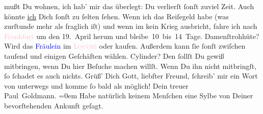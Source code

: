                mußt Du wohnen, ich hab’ mir das überlegt: Du verlierſt ſonſt zuviel Zeit. Auch
               könnte \uline{ich} Dich ſonſt zu ſelten ſehen.\pend
           \pstart
           {\pb}Wenn ich das Reiſegeld habe (was zurſtunde mehr als
               fraglich iſt) und wenn im \label{K_L02807-23v}\label{K_L02807-23h} kein Krieg ausbricht, fahre ich nach \textcolor{pink}{Frankfurt}{}\ledrightnote{\textcolor{pink}{Frankfurt am Main}} um den 19. April herum und
               bleibe 10 bis 14 Tage.\pend
           \pstart
           Damenſtrohhüte? Wird  das \textcolor{blue}{Fräulein}{} im \textcolor{pink}{\textsc{Louvre}}{}\ledrightnote{\textcolor{pink}{Louvre}} oder \label{K_L02807-45v}\label{K_L02807-45h} kaufen.  Außerdem kann ſie ſonſt zwiſchen
               tauſend und einigen Geſchäften wählen.\pend
           \pstart
           Cylinder? Den ſollſt Du gewiß mitbringen,
                wenn Du hier Beſuche machen willſt. Wenn {\pb}Du ihn nicht mitbringſt, ſo ſchadet es auch nichts.\pend
           \pstart
           Grüß’ Dich Gott, liebſter Freund, ſchreib’ mir ein Wort \strikeout{\textcolor{gray}{×}} von unterwegs und komme ſo bald als möglich!\pend
           \pstart
           Dein treuer {\\[\baselineskip]}\spacefill\mbox{Paul Goldmann.}\pend
           \leftskip=0em{}\pstart
           \noindent{}Habe natürlich keinem Menſchen eine Sylbe von Deiner bevorſtehenden Ankunft
                  geſagt.\pend
           \endnumbering{}  
      